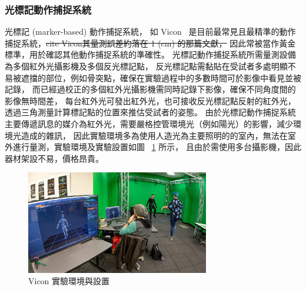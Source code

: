 \subsubsection{光標記動作捕捉系統}
光標記 (marker-based) 動作捕捉系統，
如 Vicon ~\cite{vicon_web}是目前最常見且最精準的動作捕捉系統，\sout{cite Vicon其量測誤差約落在 1 (cm) 的那篇文獻，}
因此常被當作黃金標準，用於確認其他動作捕捉系統的準確性。
光標記動作捕捉系統所需量測設備為多個紅外光攝影機及多個反光標記點，
反光標記點需黏貼在受試者多處明顯不易被遮擋的部位，例如骨突點，確保在實驗過程中的多數時間可於影像中看見並被記錄，
而已經過校正的多個紅外光攝影機需同時記錄下影像，確保不同角度間的影像無時間差，
每台紅外光可發出紅外光，也可接收反光標記點反射的紅外光，透過三角測量計算標記點的位置來推估受試者的姿態。
由於光標記動作捕捉系統主要傳遞訊息的媒介為紅外光，需要嚴格控管環境光（例如陽光）的影響，減少環境光造成的雜訊，
因此實驗環境多為使用人造光為主要照明的的室內，無法在室外進行量測，實驗環境及實驗設置如圖 ~\ref{ch2_fig_OMC_Vicon} 所示，
且由於需使用多台攝影機，因此器材架設不易，價格昂貴。

\begin{figure}[!ht]
    \centering
    \includegraphics[width=8cm]{figure/ch2_fig_OMC_Vicon.jpg}
     \caption[Vicon 實驗環境與設置]{Vicon 實驗環境與設置}
     \label{ch2_fig_OMC_Vicon}
 \end{figure}


